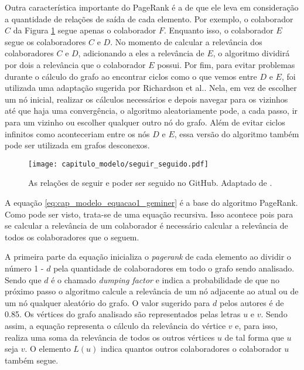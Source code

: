 Outra característica importante do PageRank é a de que ele leva em consideração a quantidade de relações de saída de cada elemento. Por exemplo, o colaborador $C$ da Figura \ref{fig:cap_modelo_seguir_seguido} segue apenas o colaborador $F$. Enquanto isso, o colaborador $E$ segue os colaboradores $C$ e $D$. No momento de calcular a relevância dos colaboradores $C$ e $D$, adicionando a eles a relevância de $E$,  o algoritmo dividirá por dois a relevância que o colaborador $E$ possui. Por fim, para evitar problemas durante o cálculo do grafo ao encontrar ciclos como o que vemos entre $D$ e $E$,  foi utilizada uma adaptação sugerida por Richardson et al.\cite{richardson2002intelligent}. Nela, em vez de escolher um nó inicial, realizar os cálculos necessários e depois navegar para os vizinhos até que haja uma convergência, o algoritmo aleatoriamente pode, a cada passo, ir para um vizinho ou escolher qualquer outro nó do grafo. Além de evitar ciclos infinitos como aconteceriam entre os nós $D$ e $E$, essa versão do algoritmo também pode ser utilizada em grafos desconexos. 

  \begin{figure}[H]
  \centering
  \texttt{[image: capitulo\_modelo/seguir\_seguido.pdf]} 
  \caption{As relações de seguir e poder ser seguido no GitHub. Adaptado de \cite{mo2015geminer}.}
  \label{fig:cap_modelo_seguir_seguido} 
\end{figure}

A equação \ref{eq:cap_modelo_equacao1_geminer} é a base do algoritmo PageRank. Como pode ser visto, trata-se de uma equação recursiva. Isso acontece pois para se calcular a relevância de um colaborador é necessário calcular a relevância de todos os colaboradores que o seguem. 

A primeira parte da equação inicializa o \textit{pagerank} de cada elemento ao dividir o número 1 - $d$ pela quantidade de colaboradores em todo o grafo sendo analisado. Sendo que $d$ é o chamado \textit{dumping factor} e indica a probabilidade de que no próximo passo o algoritmo calcule a relevância de um nó adjacente ao atual ou de um nó qualquer aleatório do grafo.  O valor sugerido para  $d$  pelos autores é de 0.85. Os vértices do grafo analisado são representados pelas letras $u$ e $v$. Sendo assim, a equação representa o cálculo da relevância do vértice $v$ e, para isso, realiza uma soma da relevância de todos os outros vértices $u$ de tal forma que $u$ seja $v$. O elemento  $L(u)$ indica quantos outros colaboradores o colaborador $u$ também segue. 

